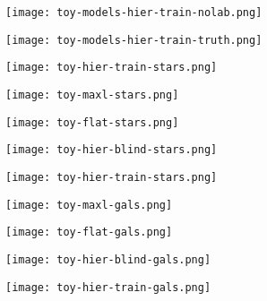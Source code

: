 \documentclass{beamer}
\begin{document}
\begin{frame}
\texttt{[image: toy-models-hier-train-nolab.png]}
\end{frame}

\begin{frame}
\texttt{[image: toy-models-hier-train-truth.png]}
\end{frame}

\begin{frame}
\texttt{[image: toy-hier-train-stars.png]}
\end{frame}

\begin{frame}
\texttt{[image: toy-maxl-stars.png]}
\end{frame}

\begin{frame}
\texttt{[image: toy-flat-stars.png]}
\end{frame}

\begin{frame}
\texttt{[image: toy-hier-blind-stars.png]}
\end{frame}

\begin{frame}
\texttt{[image: toy-hier-train-stars.png]}
\end{frame}

\begin{frame}
\texttt{[image: toy-maxl-gals.png]}
\end{frame}

\begin{frame}
\texttt{[image: toy-flat-gals.png]}
\end{frame}

\begin{frame}
\texttt{[image: toy-hier-blind-gals.png]}
\end{frame}

\begin{frame}
\texttt{[image: toy-hier-train-gals.png]}
\end{frame}
\end{document}
